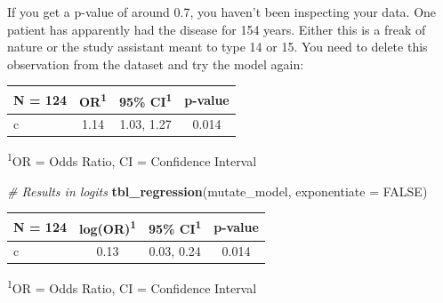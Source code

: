 \documentclass[]{book}
\newenvironment{Shaded}{\begin{snugshade}}{\end{snugshade}}
\newcommand{\CommentTok}[1]{\textcolor[rgb]{0.56,0.35,0.01}{\textit{#1}}}
\newcommand{\DataTypeTok}[1]{\textcolor[rgb]{0.13,0.29,0.53}{#1}}
\newcommand{\DecValTok}[1]{\textcolor[rgb]{0.00,0.00,0.81}{#1}}
\newcommand{\KeywordTok}[1]{\textcolor[rgb]{0.13,0.29,0.53}{\textbf{#1}}}
\newcommand{\NormalTok}[1]{#1}
\newcommand{\OperatorTok}[1]{\textcolor[rgb]{0.81,0.36,0.00}{\textbf{#1}}}
\newcommand{\OtherTok}[1]{\textcolor[rgb]{0.56,0.35,0.01}{#1}}
\newcommand{\StringTok}[1]{\textcolor[rgb]{0.31,0.60,0.02}{#1}}
\begin{document}
If you get a p-value of around 0.7, you haven't been inspecting your
data. One patient has apparently had the disease for 154 years. Either
this is a freak of nature or the study assistant meant to type 14 or 15.
You need to delete this observation from the dataset and try the model
again:

\begin{Shaded}
\end{Shaded}

\captionsetup[table]{labelformat=empty,skip=1pt}
\begin{longtable}{lccc}
\toprule
\textbf{N = 124} & \textbf{OR}\textsuperscript{1} & \textbf{95\% CI}\textsuperscript{1} & \textbf{p-value} \\ 
\midrule
c & 1.14 & 1.03, 1.27 & 0.014 \\ 
\bottomrule
\end{longtable}
\vspace{-5mm}
\begin{minipage}{\linewidth}
\textsuperscript{1}OR = Odds Ratio, CI = Confidence Interval \\ 
\end{minipage}

\begin{Shaded}
\begin{Highlighting}[]
\CommentTok{# Results in logits}
\KeywordTok{tbl_regression}\NormalTok{(mutate_model, }\DataTypeTok{exponentiate =} \OtherTok{FALSE}\NormalTok{)}
\end{Highlighting}
\end{Shaded}

\captionsetup[table]{labelformat=empty,skip=1pt}
\begin{longtable}{lccc}
\toprule
\textbf{N = 124} & \textbf{log(OR)}\textsuperscript{1} & \textbf{95\% CI}\textsuperscript{1} & \textbf{p-value} \\ 
\midrule
c & 0.13 & 0.03, 0.24 & 0.014 \\ 
\bottomrule
\end{longtable}
\vspace{-5mm}
\begin{minipage}{\linewidth}
\textsuperscript{1}OR = Odds Ratio, CI = Confidence Interval \\ 
\end{minipage}
\end{document}
